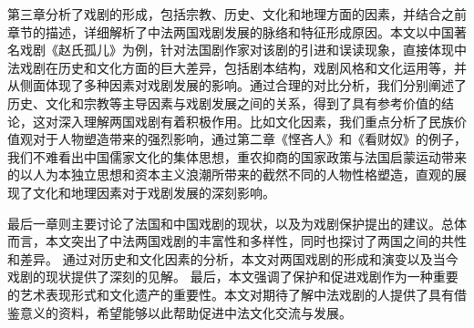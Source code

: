 \documentclass[UTF8,a4paper,12pt]{ctexart}
\numberwithin{equation}{section}
\begin{document}
第三章分析了戏剧的形成，包括宗教、历史、文化和地理方面的因素，并结合之前章节的描述，详细解析了中法两国戏剧发展的脉络和特征形成原因。本文以中国著名戏剧《赵氏孤儿》为例，针对法国剧作家对该剧的引进和误读现象，直接体现中法戏剧在历史和文化方面的巨大差异，包括剧本结构，戏剧风格和文化运用等，并从侧面体现了多种因素对戏剧发展的影响。通过合理的对比分析，我们分别阐述了历史、文化和宗教等主导因素与戏剧发展之间的关系，得到了具有参考价值的结论，这对深入理解两国戏剧有着积极作用。比如文化因素，我们重点分析了民族价值观对于人物塑造带来的强烈影响，通过第二章《悭吝人》和《看财奴》的例子，我们不难看出中国儒家文化的集体思想，重农抑商的国家政策与法国启蒙运动带来的以人为本独立思想和资本主义浪潮所带来的截然不同的人物性格塑造，直观的展现了文化和地理因素对于戏剧发展的深刻影响。

最后一章则主要讨论了法国和中国戏剧的现状，以及为戏剧保护提出的建议。总体而言，本文突出了中法两国戏剧的丰富性和多样性，同时也探讨了两国之间的共性和差异。 通过对历史和文化因素的分析，本文对两国戏剧的形成和演变以及当今戏剧的现状提供了深刻的见解。 最后，本文强调了保护和促进戏剧作为一种重要的艺术表现形式和文化遗产的重要性。本文对期待了解中法戏剧的人提供了具有借鉴意义的资料，希望能够以此帮助促进中法文化交流与发展。 %
\end{document}
